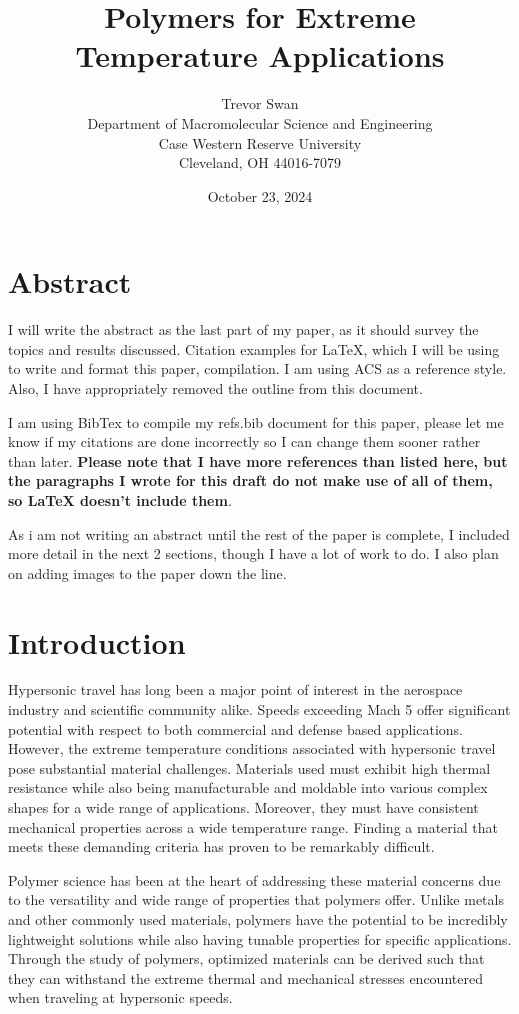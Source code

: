 \documentclass[12pt, twocolumn]{article}
\title{Polymers for Extreme Temperature Applications}
\author{Trevor Swan \\
Department of Macromolecular Science and Engineering \\ 
Case Western Reserve University \\
Cleveland, OH 44016-7079}
\date{October 23, 2024}
\begin{document}
\maketitle

\section{Abstract}

\indent I will write the abstract as the last part of my paper, as it should survey the topics and results discussed. Citation examples for LaTeX, which I will be using to write and format this paper, compilation. I am using ACS as a reference style. Also, I have appropriately removed the outline from this document.
	
\indent I am using BibTex to compile my refs.bib document for this paper, please let me know if my citations are done incorrectly so I can change them sooner rather than later. \textbf{Please note that I have more references than listed here, but the paragraphs I wrote for this draft do not make use of all of them, so LaTeX doesn't include them}.

\indent As i am not writing an abstract until the rest of the paper is complete, I included more detail in the next 2 sections, though I have a lot of work to do. I also plan on adding images to the paper down the line.

\section{Introduction}

\indent Hypersonic travel has long been a major point of interest in the aerospace industry and scientific community alike. Speeds exceeding Mach 5 offer significant potential with respect to both commercial and defense based applications. However, the extreme temperature conditions associated with hypersonic travel pose substantial material challenges. Materials used must exhibit high thermal resistance while also being manufacturable and moldable into various complex shapes for a wide range of applications. Moreover, they must have consistent mechanical properties across a wide temperature range. Finding a material that meets these demanding criteria has proven to be remarkably difficult.
	
\indent Polymer science has been at the heart of addressing these material concerns due to the versatility and wide range of properties that polymers offer. Unlike metals and other commonly used materials, polymers have the potential to be incredibly lightweight solutions while also having tunable properties for specific applications. Through the study of polymers, optimized materials can be derived such that they can withstand the extreme thermal and mechanical stresses encountered when traveling at hypersonic speeds. 
\end{document}

